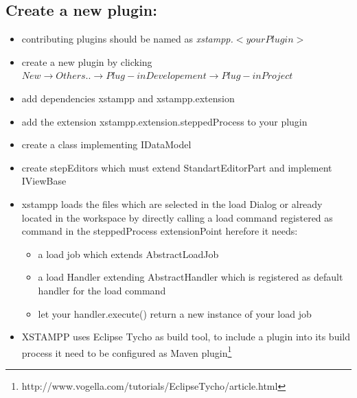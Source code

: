 \subsection{Create a new plugin:}
\begin{itemize}
\item contributing plugins should be named as \textit{xstampp.}$<your Plugin>$
\item create a new plugin by clicking $New\rightarrow Others..\rightarrow Plug-in Developement\rightarrow Plug-in Project$
\item add dependencies xstampp and xstampp.extension
\item add the extension xstampp.extension.steppedProcess to your plugin
\item create a class implementing IDataModel
\item create stepEditors which must extend StandartEditorPart and implement IViewBase
\item xstampp loads the files which are selected in the load Dialog or already located in the workspace 
	  by directly calling a load command registered as command in the steppedProcess extensionPoint herefore it needs:
	\begin{itemize}
	\item a load job which extends AbstractLoadJob
	\item a load Handler extending AbstractHandler which is registered as default handler for the load command 
	\item let your handler.execute() return a new instance of your load job
	\end{itemize}
\item XSTAMPP uses Eclipse Tycho as build tool, to include a  plugin into its build process it need to be configured as Maven plugin\footnote{http://www.vogella.com/tutorials/EclipseTycho/article.html}
\end{itemize}